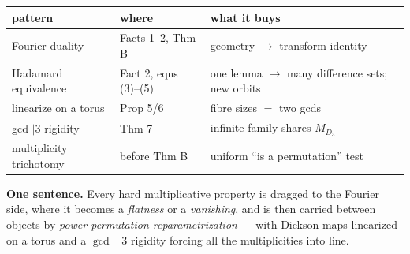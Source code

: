 \documentclass[11pt]{article}
\begin{document}
\vspace{4mm}
\begin{center}\footnotesize
\renewcommand{\arraystretch}{1.35}
\begin{tabular}{@{}l l l@{}}
\hline
\textbf{pattern} & \textbf{where} & \textbf{what it buys}\\
\hline
\textcolor{cFour}{Fourier duality} & Facts 1--2, Thm B & geometry $\to$ transform identity\\
\textcolor{cGold}{Hadamard equivalence} & Fact 2, eqns (3)--(5) & one lemma $\to$ many difference sets; new orbits\\
\textcolor{cGold}{linearize on a torus} & Prop 5/6 & fibre sizes $=$ two gcds\\
\textcolor{cGold}{gcd $\mid 3$ rigidity} & Thm 7 & infinite family shares $M_{D_3}$\\
\textcolor{cInk}{multiplicity trichotomy} & before Thm B & uniform ``is a permutation'' test\\
\hline
\end{tabular}
\end{center}

\vfill
\begin{center}\footnotesize
\parbox{0.88\textwidth}{\centering
\textbf{One sentence.} Every hard multiplicative property is dragged to the
Fourier side, where it becomes a \emph{flatness} or a \emph{vanishing}, and is
then carried between objects by \emph{power-permutation reparametrization} ---
with Dickson maps linearized on a torus and a $\gcd\mid 3$ rigidity forcing all
the multiplicities into line.}
\end{center}
\end{document}
